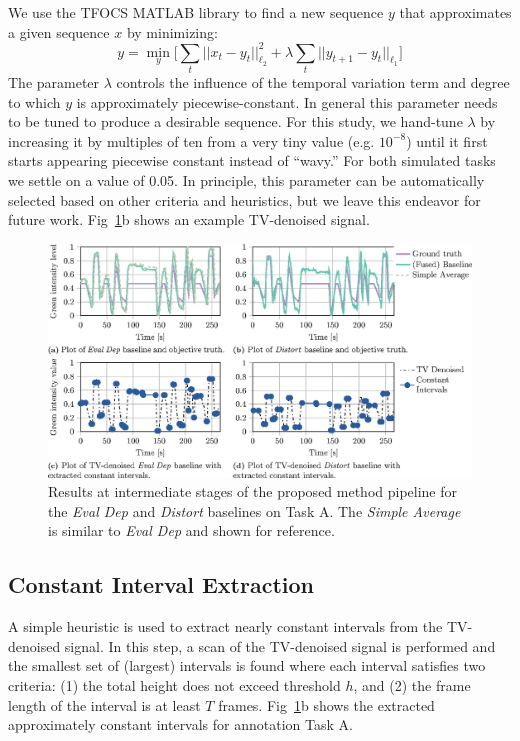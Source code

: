 \documentclass[10pt,letterpaper]{article}
\begin{document}
We use the TFOCS MATLAB library \cite{becker2011templates} to find a new sequence $y$ that approximates a given sequence $x$ by minimizing:
\begin{equation*}
y = \min_{y} \Big[\sum_{t} ||x_t - y_t||_{\ell_2}^2 + \lambda\sum_{t} ||y_{t+1} - y_{t}||_{\ell_1}\Big]
\end{equation*}
The parameter $\lambda$ controls the influence of the temporal variation term and degree to which $y$ is approximately piecewise-constant.  In general this parameter needs to be tuned to produce a desirable sequence.  For this study, we hand-tune $\lambda$ by increasing it by multiples of ten from a very tiny value (e.g. $10^{-8}$) until it first starts appearing piecewise constant instead of ``wavy.''  For both simulated tasks we settle on a value of 0.05.  In principle, this parameter can be automatically selected based on other criteria and heuristics, but we leave this endeavor for future work.  Fig~\ref{Fig:4}b shows an example TV-denoised signal.

\begin{figure}
    \begin{adjustwidth}{-2.25in}{0in}
	\centering
	\includegraphics{images/Fig4.eps}
	\vspace{0.5em}
	\caption{Results at intermediate stages of the proposed method pipeline for the \textit{Eval Dep} and \textit{Distort} baselines on Task A.  The \textit{Simple Average} is similar to \textit{Eval Dep} and shown for reference.}
	\label{Fig:4}
	\end{adjustwidth}
\end{figure}

\subsection*{Constant Interval Extraction}
A simple heuristic is used to extract nearly constant intervals from the TV-denoised signal.  In this step, a scan of the TV-denoised signal is performed and the smallest set of (largest) intervals is found where each interval satisfies two criteria: (1) the total height does not exceed threshold $h$, and (2) the frame length of the interval is at least $T$ frames.  Fig~\ref{Fig:4}b shows the extracted approximately constant intervals for annotation Task A.
\end{document}
